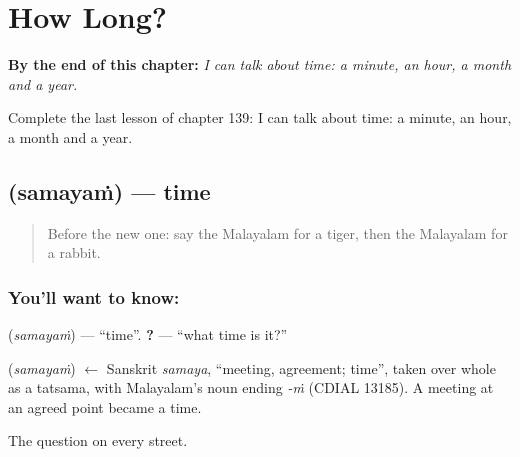 
\chapter{How Long?}
\label{ch:ml-how-long}

\begin{chapteropening}
\textbf{By the end of this chapter:} \emph{I can talk about time: a minute, an hour, a month and a year.}

Complete the last lesson of chapter 139: I can talk about time: a minute, an hour, a month and a year.
\end{chapteropening}

\section[\texorpdfstring{\ml{സമയം} (samayaṁ)}{സമയം (samayaṁ)}]{ (samayaṁ) — time}

\label{lesson:ML-C139-time}



\begin{quote}
Before the new one: say the Malayalam for a tiger, then the Malayalam for a rabbit.
\end{quote}

\subsection*{You'll want to know: }
\textbf{} (\emph{samayaṁ}) — \textquotedblleft{}time\textquotedblright{}. \textbf{ ?} — \textquotedblleft{}what time is it?\textquotedblright{}

\begin{cousinweb}
\textbf{} (\emph{samayaṁ}) $\leftarrow$ Sanskrit \emph{samaya}, \textquotedblleft{}meeting, agreement; time\textquotedblright{}, taken over whole as a tatsama, with Malayalam's noun ending \emph{-ṁ} (CDIAL 13185). A meeting at an agreed point became a time.
\end{cousinweb}

\begin{grammarlens}[title={What you've built}]
The question on every street.
\end{grammarlens}

